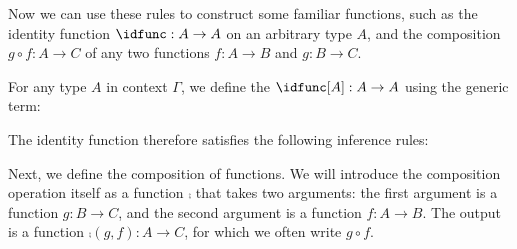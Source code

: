 Now we can use these rules to construct some familiar functions, such as the identity function $\idfunc:A\to A$ on an arbitrary type $A$, and the composition $g\circ f:A\to C$ of any two functions $f:A\to B$ and $g:B\to C$. 

\begin{defn}
For any type $A$ in context $\Gamma$, we define the  $\idfunc[A]:A\to A$ using the generic term:
\begin{prooftree}
\end{prooftree}
\end{defn}

The identity function therefore satisfies the following inference rules:
  \begin{center}
    \begin{minipage}{.45\textwidth}
      \begin{prooftree}
      \end{prooftree}
    \end{minipage}
    \begin{minipage}{.45\textwidth}
      \begin{prooftree}
      \end{prooftree}
    \end{minipage}
  \end{center}

Next, we define the composition of functions. We will introduce the composition operation itself as a function $\comp$ that takes two arguments: the first argument is a function $g:B\to C$, and the second argument is a function $f:A\to B$. The output is a function $\comp(g,f):A\to C$, for which we often write $g\circ f$.

